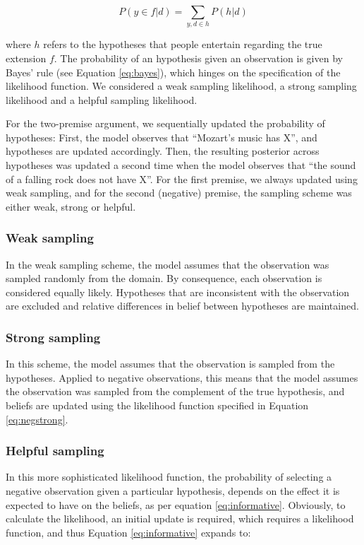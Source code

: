 \documentclass[authoryear,11pt]{elsarticle}
\begin{document}
$$P(y \in f|d)=\sum_{y,d\in h}{P(h|d)}$$

\noindent
where $h$ refers to the hypotheses that people entertain regarding the true extension $f$. The probability of an hypothesis given an observation is given by Bayes' rule (see Equation \ref{eq:bayes}), which hinges on the specification of the likelihood function. We considered a weak sampling likelihood, a strong sampling likelihood and a helpful sampling likelihood.

For the two-premise argument, we sequentially updated the probability of hypotheses: First, the model observes that ``Mozart's music has X'', and hypotheses are updated accordingly. Then, the resulting posterior across hypotheses was updated a second time when the model observes that ``the sound of a falling rock does not have X''. For the first premise, we always updated using weak sampling, and for the second (negative) premise, the sampling scheme was either weak, strong or helpful.

\subsubsection*{Weak sampling}

In the weak sampling scheme, the model assumes that the observation was sampled randomly from the domain. By consequence, each observation is considered equally likely. Hypotheses that are inconsistent with the observation are excluded and relative differences in belief between hypotheses are maintained.

\subsubsection*{Strong sampling}

In this scheme, the model assumes that the observation is sampled from the hypotheses. Applied to negative observations, this means that the model assumes the observation was sampled from the complement of the true hypothesis, and beliefs are updated using the likelihood function specified in Equation \ref{eq:negstrong}.

\subsubsection*{Helpful sampling}

In this more sophisticated likelihood function, the probability of selecting a negative observation given a particular hypothesis, depends on the effect it is expected to have on the beliefs, as per equation \ref{eq:informative}. Obviously, to calculate the likelihood, an initial update is required, which requires a likelihood function, and thus Equation \ref{eq:informative} expands to:
\end{document}

